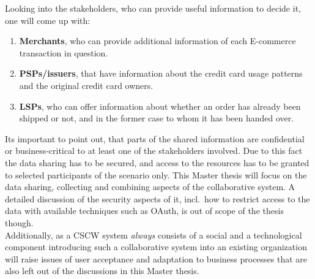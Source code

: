 Looking into the stakeholders, who can provide useful information to decide it, one will come up with:\@

\begin{enumerate}
    \item \textbf{Merchants}, who can provide additional information of each \gls{E-commerce} transaction in question.
    \item \textbf{\gls{PSP}s/issuers}, that have information about the credit card usage patterns and the original credit card owners.
    \item \textbf{\gls{LSP}s}, who can offer information about whether an order has already been shipped or not, and in the former case to whom it has been handed over.
\end{enumerate}

Its important to point out, that parts of the shared information are confidential or business-critical to at least one of the stakeholders involved. Due to this fact the data sharing has to be secured, and access to the resources has to be granted to selected participants of the scenario only. This Master thesis will focus on the data sharing, collecting and combining aspects of the collaborative system. A detailed discussion of the security aspects of it, incl.\ how to restrict access to the data with available techniques such as \gls{OAuth}, is out of scope of the thesis though.\\

 Additionally, as a \gls{CSCW} system \emph{always} consists of a social and a technological component introducing such a collaborative system into an existing organization will raise issues of user acceptance and adaptation to business processes that are also left out of the discussions in this Master thesis. 

